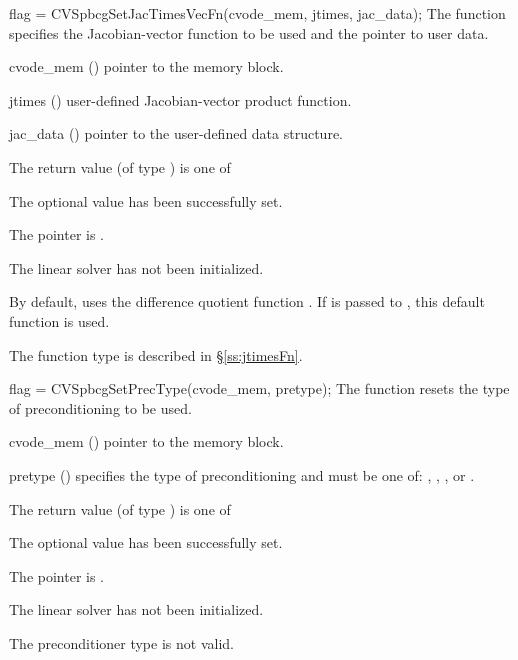 {
  flag = CVSpbcgSetJacTimesVecFn(cvode\_mem, jtimes, jac\_data);
}
{
  The function  specifies the Jacobian-vector 
  function to be used and the pointer to user data.
}
{
  \begin{args}
  \item[cvode\_mem] ()
    pointer to the {\cvodes} memory block.
  \item[jtimes] ()
    user-defined Jacobian-vector product function.
  \item[jac\_data] ()
     pointer to the user-defined data structure.
  \end{args}
}
{
  The return value  (of type ) is one of
  \begin{args}
  \item[\Id{CVSPBCG\_SUCCESS}] 
    The optional value has been successfully set.
  \item[\Id{CVSPBCG\_MEM\_NULL}]
    The  pointer is .
  \item[\Id{CVSPBCG\_LMEM\_NULL}]
    The {\cvspbcg} linear solver has not been initialized.
  \end{args}
}
{
  By default, {\cvspbcg} uses the difference quotient function .
  If  is passed to , this default function is used.

  The function type  is described in \S\ref{ss:jtimesFn}.
}
{
  flag = CVSpbcgSetPrecType(cvode\_mem, pretype);
}
{
  The function  resets the type
  of preconditioning to be used.
}
{
  \begin{args}
  \item[cvode\_mem] ()
    pointer to the {\cvodes} memory block.
  \item[pretype] ()
    specifies the type of preconditioning and must be one of:
    , , , or .
  \end{args}
}
{
  The return value  (of type ) is one of
  \begin{args}
  \item[\Id{CVSPBCG\_SUCCESS}] 
    The optional value has been successfully set.
  \item[\Id{CVSPBCG\_MEM\_NULL}]
    The  pointer is .
  \item[\Id{CVSPBCG\_LMEM\_NULL}]
    The {\cvspbcg} linear solver has not been initialized.
  \item[\Id{CVSPBCG\_ILL\_INPUT}]
    The preconditioner type  is not valid.
  \end{args}
}

